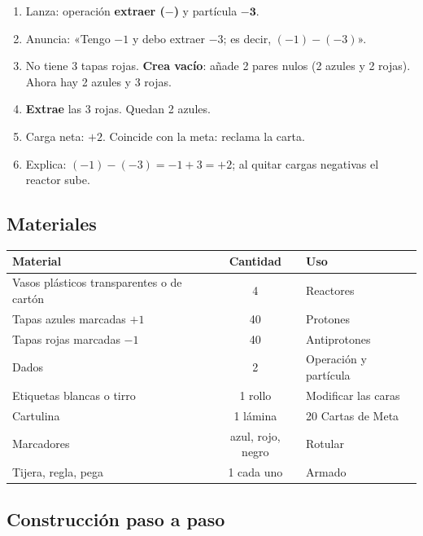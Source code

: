 \documentclass[12pt, letterpaper]{article}
\begin{document}
\begin{cuadrosolucion}
\begin{enumerate}[leftmargin=*]
  \item Lanza: operación \textbf{extraer ($-$)} y partícula $\mathbf{-3}$.
  \item Anuncia: «Tengo $-1$ y debo extraer $-3$; es decir, $(-1)-(-3)$».
  \item No tiene 3 tapas rojas. \textbf{Crea vacío}: añade 2 pares nulos (2 azules y 2 rojas). Ahora hay 2 azules y 3 rojas.
  \item \textbf{Extrae} las 3 rojas. Quedan 2 azules.
  \item Carga neta: $+2$. Coincide con la meta: reclama la carta.
  \item Explica: $(-1)-(-3)=-1+3=+2$; al quitar cargas negativas el reactor sube.
\end{enumerate}
\end{cuadrosolucion}

\subsection{Materiales}

\begin{center}
\small
\begin{tabular}{@{}p{5.0cm} c p{7.4cm}@{}}
\toprule
\textbf{Material} & \textbf{Cantidad} & \textbf{Uso}\\
\midrule
Vasos plásticos transparentes o de cartón & 4 & Reactores\\
Tapas azules marcadas $+1$ & 40 & Protones\\
Tapas rojas marcadas $-1$ & 40 & Antiprotones\\
Dados & 2 & Operación y partícula\\
Etiquetas blancas o tirro & 1 rollo & Modificar las caras\\
Cartulina & 1 lámina & 20 Cartas de Meta\\
Marcadores & azul, rojo, negro & Rotular\\
Tijera, regla, pega & 1 cada uno & Armado\\
\bottomrule
\end{tabular}
\end{center}

\subsection{Construcción paso a paso}
\end{document}
